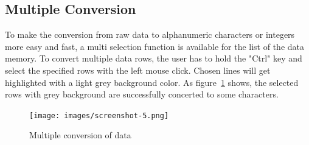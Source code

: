 \subsection{Multiple Conversion}
To make the conversion from raw data to alphanumeric characters or integers more easy and fast, a multi selection function is available for the list of the data memory.
To convert multiple data rows, the user has to hold the "Ctrl" key and select the specified rows with the left mouse click. Chosen lines will get highlighted with a light grey background color. As figure~\ref{fig:multipleConversion} shows, the selected rows with grey background are successfully concerted to some characters.
\begin{figure}[h] 
	\centering
	\texttt{[image: images/screenshot-5.png]}
	\caption{Multiple conversion of data}
	\label{fig:multipleConversion}
\end{figure}
